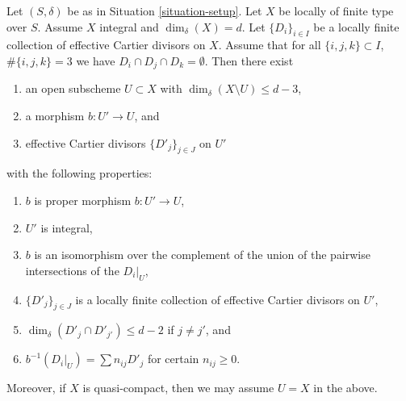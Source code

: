 \begin{lemma}
\label{lemma-blowing-up-intersections}
Let $(S, \delta)$ be as in Situation \ref{situation-setup}.
Let $X$ be locally of finite type over $S$.
Assume $X$ integral and $\dim_\delta(X) = d$.
Let $\{D_i\}_{i \in I}$ be a locally finite collection of
effective Cartier divisors on $X$.
Assume that for all $\{i, j, k\} \subset I$, $\#\{i, j, k\} = 3$
we have $D_i \cap D_j \cap D_k = \emptyset$.
Then there exist
\begin{enumerate}
\item an open subscheme $U \subset X$ with
$\dim_\delta(X \setminus U) \leq d - 3$,
\item a morphism $b : U' \to U$, and
\item effective Cartier divisors $\{D'_j\}_{j \in J}$ on $U'$
\end{enumerate}
with the following properties:
\begin{enumerate}
\item $b$ is proper morphism $b : U' \to U$,
\item $U'$ is integral,
\item $b$ is an isomorphism over the complement of the union of the pairwise
intersections of the $D_i|_U$,
\item $\{D'_j\}_{j \in J}$ is a locally finite collection of effective
Cartier divisors on $U'$,
\item $\dim_\delta(D'_j \cap D'_{j'}) \leq d - 2$ if $j \not = j'$, and
\item $b^{-1}(D_i|_U) = \sum n_{ij} D'_j$ for certain $n_{ij} \geq 0$.
\end{enumerate}
Moreover, if $X$ is quasi-compact, then we may assume $U = X$ in the above.
\end{lemma}

